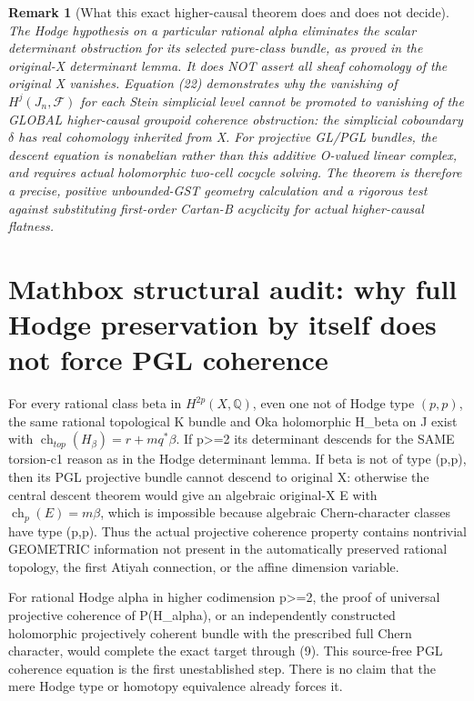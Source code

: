 \documentclass[11pt]{article}
\newtheorem{remark}[theorem]{Remark}
\begin{document}
\begin{remark}[What this exact higher-causal theorem does and does not decide]
The Hodge hypothesis on a
particular rational alpha
eliminates the scalar
determinant obstruction
for its selected pure-class
bundle, as proved in
the original-X determinant
lemma. It does NOT assert
all sheaf cohomology of the
original X vanishes.
Equation (22) demonstrates
why the vanishing of
$H^j(J_n,\mathcal F)$
for each Stein simplicial
level cannot be promoted
to vanishing of the GLOBAL
higher-causal groupoid
coherence obstruction:
the simplicial coboundary
$\delta$ has real
cohomology inherited from X.
For projective GL/PGL
bundles, the descent equation
is nonabelian rather than
this additive O-valued
linear complex, and
requires actual holomorphic
two-cell cocycle solving.
The theorem is therefore
a precise, positive
unbounded-GST geometry
calculation and a rigorous
test against substituting
first-order Cartan-B
acyclicity for actual
higher-causal flatness.
\end{remark}

\section{Mathbox structural audit: why full Hodge preservation by itself does not force PGL coherence}
For every rational class beta in
$H^{2p}(X,\mathbb Q)$, even one
not of Hodge type $(p,p)$,
the same rational topological
K bundle and Oka holomorphic
H_beta on J exist with
$\operatorname{ch}_{top}(H_\beta)
=r+m q^*\beta$.
If p>=2 its determinant descends
for the SAME torsion-c1 reason
as in the Hodge determinant lemma.
If beta is not of type (p,p),
then its PGL projective bundle
cannot descend to original X:
otherwise the central descent
theorem would give an algebraic
original-X E with
$\operatorname{ch}_p(E)=m\beta$,
which is impossible because
algebraic Chern-character classes
have type (p,p).
Thus the actual projective
coherence property contains
nontrivial GEOMETRIC information
not present in the automatically
preserved rational topology,
the first Atiyah connection,
or the affine dimension variable.

For rational Hodge alpha in
higher codimension p>=2,
the proof of universal projective
coherence of P(H_alpha), or an
independently constructed
holomorphic projectively
coherent bundle with the
prescribed full Chern character,
would complete the exact target
through (9). This source-free
PGL coherence equation is
the first unestablished step.
There is no claim that the
mere Hodge type or homotopy
equivalence already forces it.
\end{document}
